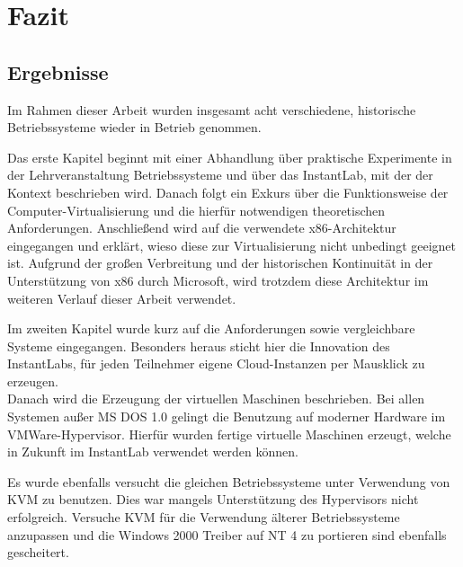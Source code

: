 \chapter{Fazit}
\label{chap:evaluation}


\section{Ergebnisse}
\label{sec:results}

	Im Rahmen dieser Arbeit wurden insgesamt acht verschiedene, historische Betriebssysteme wieder in Betrieb genommen.

	Das erste Kapitel beginnt mit einer Abhandlung über praktische Experimente in der Lehrveranstaltung Betriebssysteme und über das InstantLab, mit der der Kontext beschrieben wird.
	Danach folgt ein Exkurs über die Funktionsweise der Computer-Virtualisierung und die hierfür notwendigen theoretischen Anforderungen.
	Anschließend wird auf die verwendete x86-Architektur eingegangen und erklärt, wieso diese zur Virtualisierung nicht unbedingt geeignet ist. 
	Aufgrund der großen Verbreitung und der historischen Kontinuität in der Unterstützung von x86 durch Microsoft, wird trotzdem diese Architektur im weiteren Verlauf dieser Arbeit verwendet.

	Im zweiten Kapitel wurde kurz auf die Anforderungen sowie vergleichbare Systeme eingegangen.
	Besonders heraus sticht hier die Innovation des InstantLabs, für jeden Teilnehmer eigene Cloud-Instanzen per Mausklick zu erzeugen. \\ 

	Danach wird die Erzeugung der virtuellen Maschinen beschrieben.
	Bei allen Systemen außer MS DOS 1.0 gelingt die Benutzung auf moderner Hardware im VMWare-Hypervisor.
	Hierfür wurden fertige virtuelle Maschinen erzeugt, welche in Zukunft im InstantLab verwendet werden können.

	Es wurde ebenfalls versucht die gleichen Betriebssysteme unter Verwendung von KVM zu benutzen.
	Dies war mangels Unterstützung des Hypervisors nicht erfolgreich.
	Versuche KVM für die Verwendung älterer Betriebssysteme anzupassen und die Windows 2000 Treiber auf NT 4 zu portieren sind ebenfalls gescheitert.

